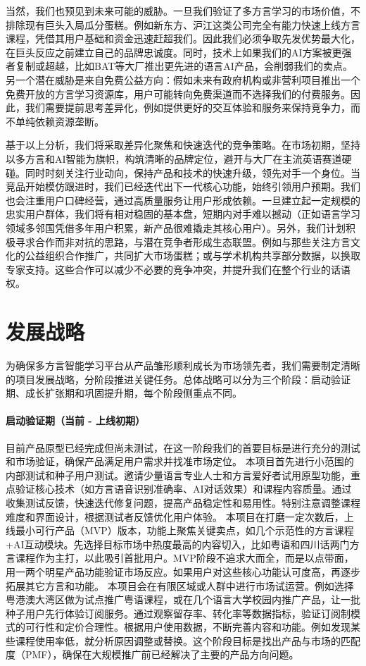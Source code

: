 当然，我们也预见到未来可能的威胁。一旦我们验证了多方言学习的市场价值，不排除现有巨头入局瓜分蛋糕。例如新东方、沪江这类公司完全有能力快速上线方言课程，凭借其用户基础和资金迅速赶超我们。因此我们必须争取先发优势最大化，在巨头反应之前建立自己的品牌忠诚度。同时，技术上如果我们的AI方案被更强者复制或超越，比如BAT等大厂推出更先进的语言AI产品，会削弱我们的卖点。另一个潜在威胁是来自免费公益方向：假如未来有政府机构或非营利项目推出一个免费开放的方言学习资源库，用户可能转向免费渠道而不选择我们的付费服务。因此，我们需要提前思考差异化，例如提供更好的交互体验和服务来保持竞争力，而不单纯依赖资源垄断。

基于以上分析，我们将采取差异化聚焦和快速迭代的竞争策略。在市场初期，坚持以多方言和AI智能为旗帜，构筑清晰的品牌定位，避开与大厂在主流英语赛道硬碰。同时时刻关注行业动向，保持产品和技术的快速升级，领先对手一个身位。当竞品开始模仿跟进时，我们已经迭代出下一代核心功能，始终引领用户预期。我们也会注重用户口碑经营，通过高质量服务让用户形成依赖。一旦建立起一定规模的忠实用户群体，我们将有相对稳固的基本盘，短期内对手难以撼动（正如语言学习领域多邻国凭借多年用户积累，新产品很难撬走其核心用户）。另外，我们计划积极寻求合作而非对抗的思路，与潜在竞争者形成生态联盟。例如与那些关注方言文化的公益组织合作推广，共同扩大市场蛋糕；或与学术机构共享部分数据，以换取专家支持。这些合作可以减少不必要的竞争冲突，并提升我们在整个行业的话语权。
\section{发展战略}
为确保多方言智能学习平台从产品雏形顺利成长为市场领先者，我们需要制定清晰的项目发展战略，分阶段推进关键任务。总体战略可以分为三个阶段：启动验证期、成长扩张期和巩固提升期，每个阶段侧重点不同。

\paragraph{启动验证期（当前 - 上线初期）}目前产品原型已经完成但尚未测试，在这一阶段我们的首要目标是进行充分的测试和市场验证，确保产品满足用户需求并找准市场定位。
	本项目首先进行小范围的内部测试和种子用户测试。邀请少量语言专业人士和方言爱好者试用原型功能，重点验证核心技术（如方言语音识别准确率、AI对话效果）和课程内容质量。通过收集测试反馈，快速迭代修复问题，提高产品稳定性和易用性。特别注意调整课程难度和界面设计，根据测试者反馈优化用户体验。
	本项目在打磨一定次数后，上线最小可行产品（MVP）版本，功能上聚焦关键卖点，如几个示范性的方言课程+AI互动模块。先选择目标市场中热度最高的内容切入，比如粤语和四川话两门方言课程作为主打，以此吸引首批用户。MVP阶段不追求大而全，而是以点带面，用一两个明星产品功能验证市场反应。如果用户对这些核心功能认可度高，再逐步拓展其它方言和功能。
	本项目会在有限区域或人群中进行市场试运营。例如选择粤港澳大湾区做为试点推广粤语课程，或在几个语言大学校园内推广产品，让一批种子用户先行体验订阅服务。通过观察留存率、转化率等数据指标，验证订阅制模式的可行性和定价合理性。根据用户使用数据，不断完善内容和功能。例如发现某些课程使用率低，就分析原因调整或替换。这个阶段目标是找出产品与市场的匹配度（PMF），确保在大规模推广前已经解决了主要的产品方向问题。

